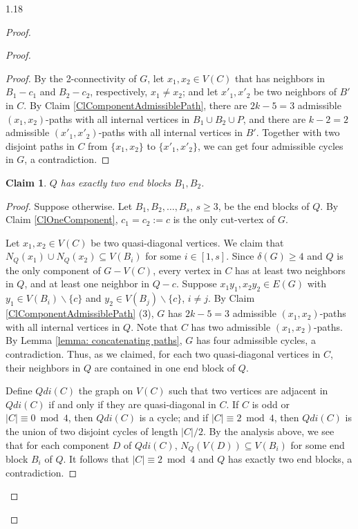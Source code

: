 \documentclass[10pt]{article}
\newtheorem{subclaim}{Claim}[claim]
\begin{document}
\begin{spacing}{1.18}
\begin{proof}
\begin{proof}
\begin{proof}
        By the 2-connectivity of $G$, let $x_1,x_2\in V(C)$ that has neighbors in $B_1-c_1$ and $B_2-c_2$, respectively, $x_1\neq x_2$; and let $x'_1,x'_2$ be two neighbors of $B'$ in $C$. By Claim \ref{ClComponentAdmissiblePath}, there are $2k-5=3$ admissible $(x_1,x_2)$-paths with all internal vertices in $B_1\cup B_2\cup P$, and there are $k-2=2$ admissible $(x'_1,x'_2)$-paths with all internal vertices in $B'$. Together with two disjoint paths in $C$ from $\{x_1,x_2\}$ to $\{x'_1,x'_2\}$, we can get four admissible cycles in $G$, a contradiction.
    \end{proof}

    \begin{subclaim}\label{ClTwoEndBlock}
        $Q$ has exactly two end blocks $B_1,B_2$.
    \end{subclaim}

    \begin{proof}
        Suppose otherwise. Let $B_1,B_2,\ldots,B_s$, $s\geqslant 3$, be the end blocks of $Q$. By Claim \ref{ClOneComponent}, $c_1=c_2:=c$ is the only cut-vertex of $G$. 
        
        Let $x_1,x_2\in V(C)$ be two quasi-diagonal vertices. We claim that $N_Q(x_1)\cup N_Q(x_2)\subseteq V(B_i)$ for some $i\in[1,s]$. Since $\delta(G)\geqslant 4$ and $Q$ is the only component of $G-V(C)$, every vertex in $C$ has at least two neighbors in $Q$, and at least one neighbor in $Q-c$. Suppose $x_1y_1,x_2y_2\in E(G)$ with $y_1\in V(B_i)\backslash\{c\}$ and $y_2\in V(B_j)\backslash\{c\}$, $i\neq j$. By Claim \ref{ClComponentAdmissiblePath} (3), $G$ has $2k-5=3$ admissible $(x_1,x_2)$-paths with all internal vertices in $Q$. Note that $C$ has two admissible $(x_1,x_2)$-paths. By Lemma \ref{lemma: concatenating paths}, $G$ has four admissible cycles, a contradiction. Thus, as we claimed, for each two quasi-diagonal vertices in $C$, their neighbors in $Q$ are contained in one end block of $Q$.

        Define $Qdi(C)$ the graph on $V(C)$ such that two vertices are adjacent in $Qdi(C)$ if and only if they are quasi-diagonal in $C$. If $C$ is odd or $|C|\equiv 0\bmod 4$, then $Qdi(C)$ is a cycle; and if $|C|\equiv 2\bmod 4$, then $Qdi(C)$ is the union of two disjoint cycles of length $|C|/2$. By the analysis above, we see that for each component $D$ of $Qdi(C)$, $N_Q(V(D))\subseteq V(B_i)$ for some end block $B_i$ of $Q$. It follows that $|C|\equiv 2\bmod 4$ and $Q$ has exactly two end blocks, a contradiction.
    \end{proof}


\end{proof}
\end{proof}
\end{spacing}
\end{document}
